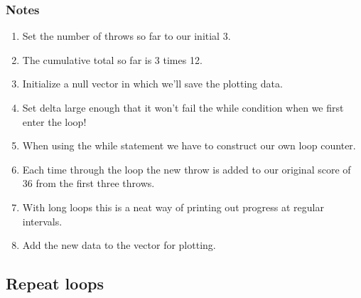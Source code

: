 \documentclass[titlepage]{book}\usepackage{knitr}
\begin{document}
\begin{knitrout}
\begin{kframe}
\begin{alltt}
\hlstd{(}
\hlopt{==}\hlstd{)}
\hlstd{\{}
  \hlstd{(}\hlstr{"Converged exactly to true mean (7).[eps = "}
\hlstd{\}}  \hlstd{\{}
  \hlstd{(} \hlstd{=} \hlstd{)}
  \hlstd{(} 
  \hlstd{(} \hlstd{=} \hlstd{)}
\hlstd{\}}

\hlcom{#------------------------------------------------------------------------------------}
\end{alltt}
\end{kframe}
\end{knitrout}
\subsubsection{Notes}
\begin{enumerate}
\item{Set the number of throws so far to our initial 3.}
\item{The cumulative total so far is 3 times 12.}
\item{Initialize a null vector in which we'll save the plotting data.}
\item{Set delta large enough that it won't fail the while condition when we first enter the loop!}
\item{When using the while statement we have to construct our own loop counter.}
\item{Each time through the loop the new throw is added to our original score of 36 from the first three throws.}
\item{With long loops this is a neat way of printing out progress at regular intervals.}
\item{Add the new data to the vector for plotting. }

\end{enumerate}
\subsection{Repeat loops}
\end{document}
